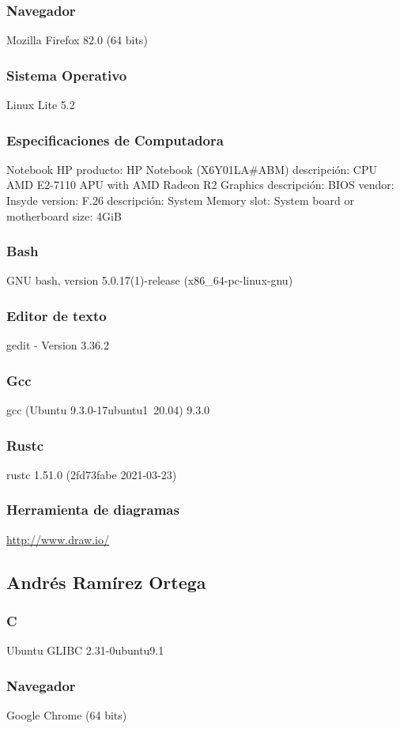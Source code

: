 \documentclass[a4paper,12pt,twoside]{article}
\begin{document}
\subsubsection{Navegador}
Mozilla Firefox 82.0 (64 bits)
\subsubsection{Sistema Operativo}
Linux Lite 5.2
\subsubsection{Especificaciones de Computadora}
Notebook HP 
\bigbreak producto: HP Notebook (X6Y01LA#ABM)
\bigbreak descripción: CPU AMD E2-7110 APU with AMD Radeon R2 Graphics
\bigbreak descripción: BIOS
          vendor: Insyde
          version: F.26
\bigbreak descripción: System Memory         
          slot: System board or motherboard
          size: 4GiB
\subsubsection{Bash}
GNU bash, version 5.0.17(1)-release (x86_64-pc-linux-gnu)
\subsubsection{Editor de texto}
gedit - Version 3.36.2
\subsubsection{Gcc}
gcc (Ubuntu 9.3.0-17ubuntu1~20.04) 9.3.0
\subsubsection{Rustc}
rustc 1.51.0 (2fd73fabe 2021-03-23)
\subsubsection{Herramienta de diagramas}
\url{http://www.draw.io/}



\subsection{Andrés Ramírez Ortega}
\subsubsection{C}
Ubuntu GLIBC 2.31-0ubuntu9.1
\subsubsection{Navegador}
Google Chrome (64 bits)
\end{document}
